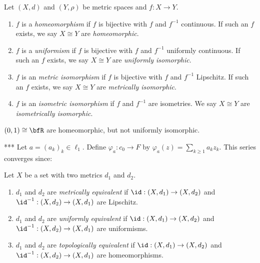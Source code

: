     \begin{definition}
        Let $(X,d)$ and $(Y,\rho)$ be metric spaces and $f:X \rightarrow Y$.
        \begin{enumerate}[label = (\arabic*),itemsep=1pt,topsep=3pt]
            \item $f$ is a \textit{homeomorphism} if $f$ is bijective with $f$ and $f^{-1}$ continuous. If such an $f$ exists, we say $X \cong Y$ are \textit{homeomorphic}.
            \item $f$ is a \textit{uniformism} if $f$ is bijective with $f$ and $f^{-1}$ uniformly continuous. If such an $f$ exists, we say $X \cong Y$ are \textit{uniformly isomorphic}.
            \item $f$ is an \textit{metric isomorphism} if $f$ is bijective with $f$ and $f^{-1}$ Lipschitz. If such an $f$ exists, we say $X \cong Y$ are \textit{metrically isomorphic}.
            \item $f$ is an \textit{isometric isomorphism} if $f$ and $f^{-1}$ are isometries. We say $X \cong Y$ are \textit{isometrically isomorphic}.
        \end{enumerate}
    \end{definition}

    \begin{example}
        $(0,1) \cong \bfR$ are homeomorphic, but not uniformly isomorphic.
    \end{example}

    \begin{example}***
        Let $a = (a_k)_k \in \ell_1$. Define $\varphi_a:c_0 \rightarrow F$ by $\varphi_a(z) = \sum_{k \geq 1}a_k z_k$. This series converges since:
    \end{example}

    \begin{definition}
        Let $X$ be a set with two metrics $d_1$ and $d_2$.
        \begin{enumerate}[label = (\arabic*),itemsep=1pt,topsep=3pt]
            \item $d_1$ and $d_2$ are \textit{metrically equivalent} if $\id:(X,d_1) \rightarrow (X,d_2)$ and $\id^{-1}:(X,d_2) \rightarrow (X,d_1)$ are Lipschitz.
            \item $d_1$ and $d_2$ are \textit{uniformly equivalent} if $\id:(X,d_1) \rightarrow (X,d_2)$ and $\id^{-1}:(X,d_2) \rightarrow (X,d_1)$ are uniformisms.
            \item $d_1$ and $d_2$ are \textit{topologically equivalent} if $\id:(X,d_1) \rightarrow (X,d_2)$ and $\id^{-1}:(X,d_2) \rightarrow (X,d_1)$ are homeomorphisms.
        \end{enumerate}
    \end{definition}


